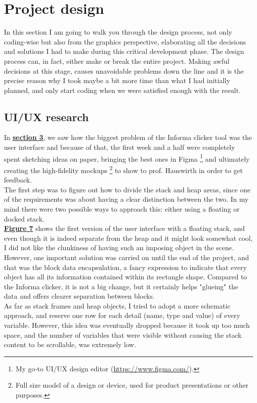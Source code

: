 \documentclass[]{usiinfbachelorproject}
\begin{document}
\section{Project design} \label{design}

In this section I am going to walk you through the design process, not only coding-wise but also from the graphics perspective, elaborating all the decisions and solutions I had to make during this critical development phase. The design process can, in fact, either make or break the entire project. Making awful decisions at this stage, causes unavoidable problems down the line and it is the precise reason why I took maybe a bit more time than what I had initially planned, and only start coding when we were satisfied enough with the result.

\subsection{UI/UX research} \label{ui-ux research}

In \hyperref[requirements+analysis]{\textbf{section 3}}, we saw how the biggest problem of the Informa clicker tool was the user interface and because of that, the first week and a half were completely spent sketching ideas on paper, bringing the best ones in Figma \footnote{My go-to UI/UX design editor (\url{https://www.figma.com/}).} and ultimately creating the high-fidelity mockups \footnote{Full size model of a design or device, used for product presentations or other purposes.} to show to prof. Hauswirth in order to get feedback.\\
The first step was to figure out how to divide the stack and heap areas, since one of the requirements was about having a clear distinction between the two. In my mind there were two possible ways to approach this: either using a floating or docked stack.\\

\noindent \hyperref[floating stack]{\textbf{Figure 7}} shows the first version of the user interface with a floating stack, and even though it is indeed separate from the heap and it might look somewhat cool, I did not like the clunkiness of having such an imposing object in the scene. However, one important solution was carried on until the end of the project, and that was the block data encapsulation, a fancy expression to indicate that every object has all its information contained within its rectangle shape. Compared to the Informa clicker, it is not a big change, but it certainly helps "glueing" the data and offers clearer separation between blocks.\\
As far as stack frames and heap objects, I tried to adopt a more schematic approach, and reserve one row for each detail (name, type and value) of every variable. However, this idea was eventually dropped because it took up too much space, and the number of variables that were visible without causing the stack content to be scrollable, was extremely low. 
\end{document}
